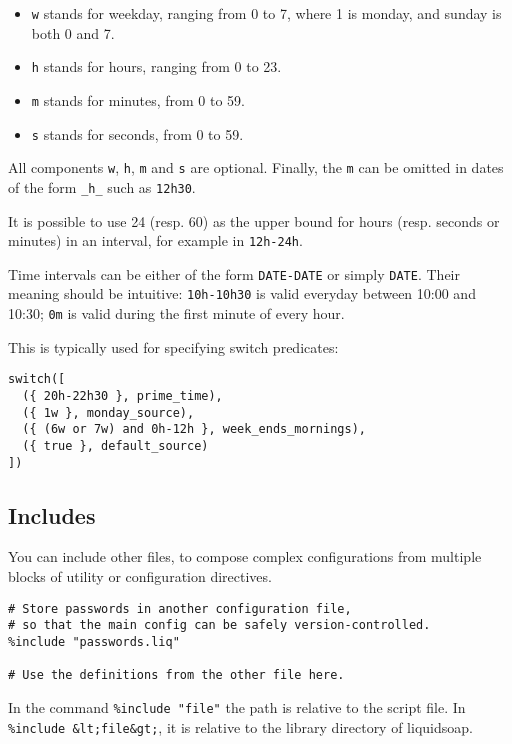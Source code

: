 \begin{itemize}
\item \verb+w+ stands for weekday, ranging from 0 to 7, where 1 is monday, and sunday is both 0 and 7.
\item \verb+h+ stands for hours, ranging from 0 to 23.
\item \verb+m+ stands for minutes, from 0 to 59.
\item \verb+s+ stands for seconds, from 0 to 59.

\end{itemize}
All components \verb+w+, \verb+h+, \verb+m+ and \verb+s+ are optional. Finally, the \verb+m+ can be omitted in dates of the form \verb+_h_+ such as \verb+12h30+.

It is possible to use 24 (resp. 60) as the upper bound for hours (resp. seconds or minutes) in an interval, for example in \verb+12h-24h+.

Time intervals can be either of the form \verb+DATE-DATE+ or simply \verb+DATE+. Their meaning should be intuitive: \verb+10h-10h30+ is valid everyday between 10:00 and 10:30; \verb+0m+ is valid during the first minute of every hour.

This is typically used for specifying switch predicates:

\begin{verbatim}
switch([
  ({ 20h-22h30 }, prime_time),
  ({ 1w }, monday_source),
  ({ (6w or 7w) and 0h-12h }, week_ends_mornings),
  ({ true }, default_source)
])
\end{verbatim}
\subsection{Includes}
You can include other files,
to compose complex configurations from
multiple blocks of utility or configuration directives.

\begin{verbatim}
# Store passwords in another configuration file,
# so that the main config can be safely version-controlled.
%include "passwords.liq"

# Use the definitions from the other file here.
\end{verbatim}
In the command \verb+%include "file"+ the path is relative to
the script file. In \verb+%include &lt;file&gt;+, it is relative
to the library directory of liquidsoap.

